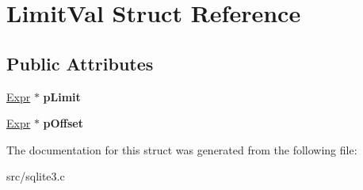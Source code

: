 \hypertarget{struct_limit_val}{\section{Limit\-Val Struct Reference}
\label{struct_limit_val}
}
\subsection*{Public Attributes}
\begin{DoxyCompactItemize}
\item 
\hypertarget{struct_limit_val_a96094d1b395a3f455263ff5907d72ed6}{\hyperlink{struct_expr}{Expr} $\ast$ {\bfseries p\-Limit}}\label{struct_limit_val_a96094d1b395a3f455263ff5907d72ed6}

\item 
\hypertarget{struct_limit_val_a43dedf453a8e5cb8091fcde524a7c736}{\hyperlink{struct_expr}{Expr} $\ast$ {\bfseries p\-Offset}}\label{struct_limit_val_a43dedf453a8e5cb8091fcde524a7c736}

\end{DoxyCompactItemize}


The documentation for this struct was generated from the following file\-:\begin{DoxyCompactItemize}
\item 
src/sqlite3.\-c\end{DoxyCompactItemize}

